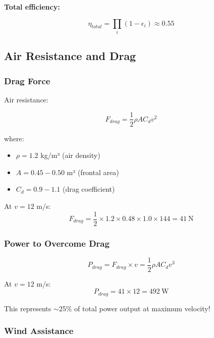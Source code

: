 \textbf{Total efficiency:}

\begin{equation}
\eta_{total} = \prod_i (1 - \epsilon_i) \approx 0.55
\label{eq:total_efficiency}
\end{equation}

\subsection{Air Resistance and Drag}

\subsubsection{Drag Force}

Air resistance:

\begin{equation}
F_{drag} = \frac{1}{2} \rho A C_d v^2
\label{eq:drag_force}
\end{equation}

where:
\begin{itemize}
\item $\rho = 1.2$ kg/m³ (air density)
\item $A = 0.45-0.50$ m² (frontal area)
\item $C_d = 0.9-1.1$ (drag coefficient)
\end{itemize}

At $v = 12$ m/s:
\begin{equation}
F_{drag} = \frac{1}{2} \times 1.2 \times 0.48 \times 1.0 \times 144 = 41~\text{N}
\label{eq:drag_at_12}
\end{equation}

\subsubsection{Power to Overcome Drag}

\begin{equation}
P_{drag} = F_{drag} \times v = \frac{1}{2} \rho A C_d v^3
\label{eq:drag_power}
\end{equation}

At $v = 12$ m/s:
\begin{equation}
P_{drag} = 41 \times 12 = 492~\text{W}
\label{eq:drag_power_12}
\end{equation}

This represents $\sim$25\% of total power output at maximum velocity!

\subsubsection{Wind Assistance}

